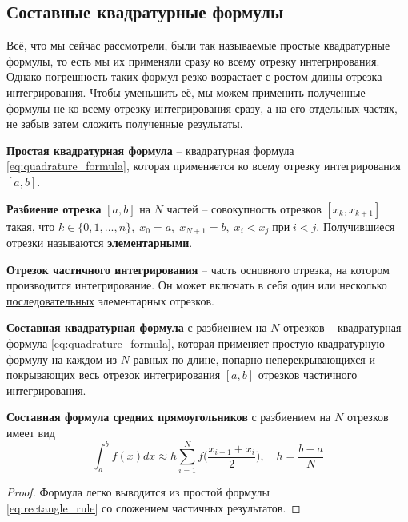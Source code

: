 \documentclass[../main.tex]{subfile}
\begin{document}
\subsection{Составные квадратурные формулы}
Всё, что мы сейчас рассмотрели, были так называемые простые квадратурные
формулы, то есть мы их применяли сразу ко всему отрезку интегрирования. Однако
погрешность таких формул резко возрастает с ростом длины отрезка интегрирования.
Чтобы уменьшить её, мы можем применить полученные формулы не ко всему отрезку
интегрирования сразу, а на его отдельных частях, не забыв затем сложить
полученные результаты.

\begin{define}
	\textbf{Простая квадратурная формула} -- квадратурная формула
	\eqref{eq:quadrature_formula}, которая применяется ко всему отрезку
	интегрирования $[a,b]$.
\end{define}

\begin{define}
	\textbf{Разбиение отрезка} $[a,b]$ на $N$ частей -- совокупность
	отрезков $[x_k,x_{k+1}]$ такая, что $k\in\{0,1,...,n\},\;x_0=a,\;x_{N+1}
	=b,\;x_i<x_j\;\text{при}\;i<j$. Получившиеся отрезки называются
	\textbf{элементарными}.
\end{define}

\begin{define}
	\textbf{Отрезок частичного интегрирования} -- часть основного отрезка,
	на котором производится интегрирование. Он может включать в себя один
	или несколько \underline{последовательных} элементарных отрезков.
\end{define}
\newpage

\begin{define}
	\textbf{Составная квадратурная формула} с разбиением на $N$ отрезков --
	квадратурная формула \eqref{eq:quadrature_formula}, которая применяет
	простую квадратурную формулу на каждом из $N$ равных по длине, попарно
	неперекрывающихся и покрывающих весь отрезок интегрирования $[a,b]$
	отрезков частичного интегрирования.
\end{define}

\begin{theorem}
	\textbf{Составная формула средних прямоугольников} с разбиением на $N$
	отрезков имеет вид
	\[\boxed{\int_a^b f(x)dx\approx h\sum_{i=1}^{N}f\Big(\frac{x_{i-1}+x_i}
	{2}\Big),\quad h=\frac{b-a}{N}}\]
\end{theorem}

\begin{proof}
	Формула легко выводится из простой формулы \\
	\eqref{eq:rectangle_rule} со сложением частичных результатов.
\end{proof}
\end{document}
